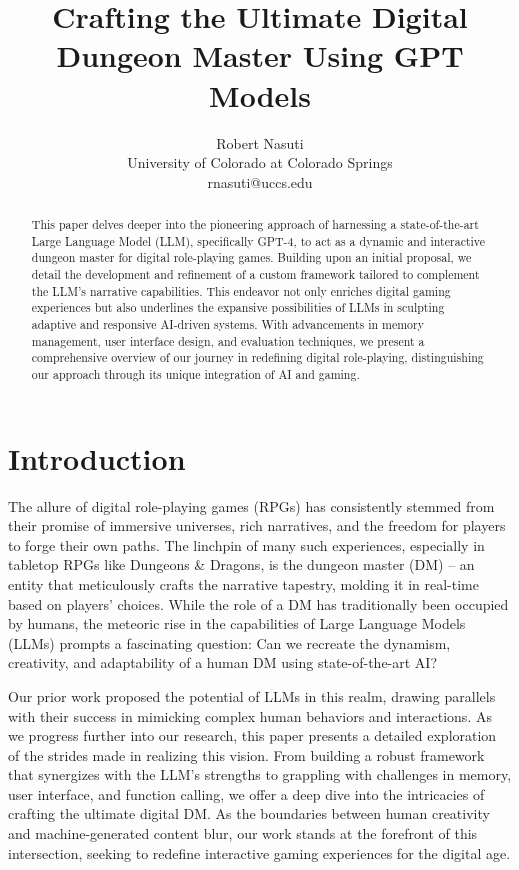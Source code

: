 \documentclass[letterpaper]{article}
\title{Crafting the Ultimate Digital Dungeon Master Using GPT Models}
\author{Robert Nasuti\\
University of Colorado at Colorado Springs\\
rnasuti@uccs.edu}
\begin{document}
\maketitle

\begin{abstract}
    This paper delves deeper into the pioneering approach of harnessing a state-of-the-art Large Language Model (LLM), specifically GPT-4, to act as a dynamic and interactive dungeon master for digital role-playing games. Building upon an initial proposal, we detail the development and refinement of a custom framework tailored to complement the LLM's narrative capabilities. This endeavor not only enriches digital gaming experiences but also underlines the expansive possibilities of LLMs in sculpting adaptive and responsive AI-driven systems. With advancements in memory management, user interface design, and evaluation techniques, we present a comprehensive overview of our journey in redefining digital role-playing, distinguishing our approach through its unique integration of AI and gaming.
\end{abstract}

\section{Introduction}
The allure of digital role-playing games (RPGs) has consistently stemmed from their promise of immersive universes, rich narratives, and the freedom for players to forge their own paths. The linchpin of many such experiences, especially in tabletop RPGs like Dungeons \& Dragons, is the dungeon master (DM) – an entity that meticulously crafts the narrative tapestry, molding it in real-time based on players' choices. While the role of a DM has traditionally been occupied by humans, the meteoric rise in the capabilities of Large Language Models (LLMs) prompts a fascinating question: Can we recreate the dynamism, creativity, and adaptability of a human DM using state-of-the-art AI?

Our prior work proposed the potential of LLMs in this realm, drawing parallels with their success in mimicking complex human behaviors and interactions. As we progress further into our research, this paper presents a detailed exploration of the strides made in realizing this vision. From building a robust framework that synergizes with the LLM's strengths to grappling with challenges in memory, user interface, and function calling, we offer a deep dive into the intricacies of crafting the ultimate digital DM. As the boundaries between human creativity and machine-generated content blur, our work stands at the forefront of this intersection, seeking to redefine interactive gaming experiences for the digital age.
\end{document}
